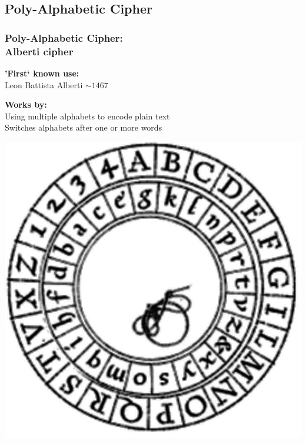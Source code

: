 \documentclass{uva-inf-presentation}
\begin{document}
\subsection{Poly-Alphabetic Cipher}
\frame{\tableofcontents[currentsubsection]}

\begin{frame}
\frametitle{Poly-Alphabetic Cipher:\\ Alberti cipher}
\begin{minipage}{0.55\linewidth}
\textbf{'First` known use:}\\
Leon Battista Alberti $\sim 1467$

\textbf{Works by:}\\
Using multiple alphabets to encode plain text\\
Switches alphabets after one or more words\\
\end{minipage}%
\begin{minipage}{0.45\linewidth}
\includegraphics[width=\linewidth]{Alberti_cipher_disk.JPG}
\end{minipage}
\end{frame}
\end{document}
